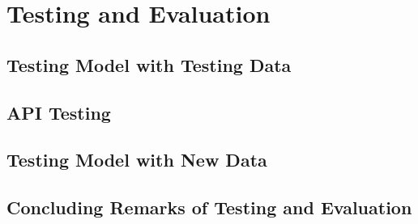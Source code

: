 \chapter{Testing and Evaluation}


\section{Testing Model with Testing Data}

\section{API Testing}

\section{Testing Model with New Data}

\section{Concluding Remarks of Testing and Evaluation}

